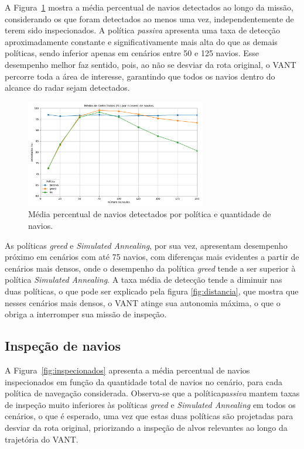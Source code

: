 A Figura~\ref{fig:detectados} mostra a média percentual de navios detectados ao longo da missão, considerando os que foram detectados ao menos uma vez, independentemente de terem sido inspecionados. A política \textit{passiva} apresenta uma taxa de detecção aproximadamente constante e significativamente mais alta do que as demais políticas, sendo inferior apenas em cenários entre 50 e 125 navios. Esse desempenho melhor faz sentido, pois, ao não se desviar da rota original, o VANT percorre toda a área de interesse, garantindo que todos os navios dentro do alcance do radar sejam detectados. 

\begin{figure}[H]
    \centering
    \includegraphics[width=0.7\textwidth]{fig/resultado_det.png}
    \caption{Média percentual de navios detectados por política e quantidade de navios.}
    \label{fig:detectados}
\end{figure}

As políticas \textit{greed} e \textit{Simulated Annealing}, por sua vez, apresentam desempenho próximo em cenários com até 75 navios, com diferenças mais evidentes a partir de cenários mais densos, onde o desempenho da política \textit{greed} tende a ser superior à política \textit{Simulated Annealing}. A taxa média de detecção tende a diminuir nas duas políticas, o que pode ser explicado pela figura \ref{fig:distancia}, que mostra que nesses cenários mais densos, o VANT atinge sua autonomia máxima, o que o obriga a interromper sua missão de inspeção.

\subsection{Inspeção de navios}

A Figura~\ref{fig:inspecionados} apresenta a média percentual de navios inspecionados em função da quantidade total de navios no cenário, para cada política de navegação considerada. Observa-se que a política\textit{passiva} mantem taxas de inspeção muito inferiores às políticas \textit{greed} e \textit{Simulated Annealing} em todos os cenários, o que é esperado, uma vez que estas duas políticas são projetadas para desviar da rota original, priorizando a inspeção de alvos relevantes ao longo da trajetória do VANT.


